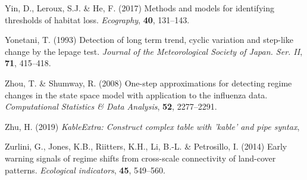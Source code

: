 \documentclass[12pt,twoside,openany]{reedthesis}
\begin{document}
\leavevmode\hypertarget{ref-yin2017methods}{}%
Yin, D., Leroux, S.J. \& He, F. (2017) Methods and models for identifying thresholds of habitat loss. \emph{Ecography}, \textbf{40}, 131--143.

\leavevmode\hypertarget{ref-yonetani1993detection}{}%
Yonetani, T. (1993) Detection of long term trend, cyclic variation and step-like change by the lepage test. \emph{Journal of the Meteorological Society of Japan. Ser. II}, \textbf{71}, 415--418.

\leavevmode\hypertarget{ref-zhou2008one}{}%
Zhou, T. \& Shumway, R. (2008) One-step approximations for detecting regime changes in the state space model with application to the influenza data. \emph{Computational Statistics \& Data Analysis}, \textbf{52}, 2277--2291.

\leavevmode\hypertarget{ref-kableExtra}{}%
Zhu, H. (2019) \emph{KableExtra: Construct complex table with 'kable' and pipe syntax},

\leavevmode\hypertarget{ref-zurlini2014early}{}%
Zurlini, G., Jones, K.B., Riitters, K.H., Li, B.-L. \& Petrosillo, I. (2014) Early warning signals of regime shifts from cross-scale connectivity of land-cover patterns. \emph{Ecological indicators}, \textbf{45}, 549--560.
\end{document}
